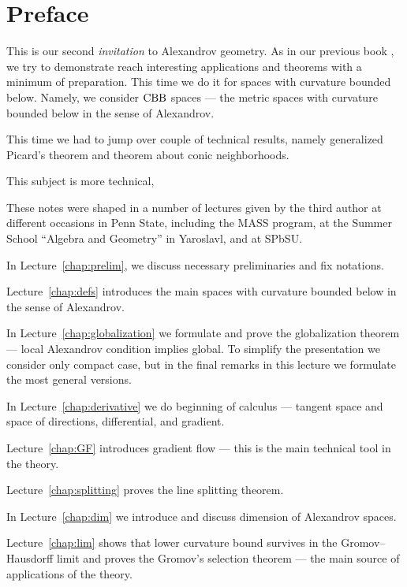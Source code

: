 \chapter*{Preface}

This is our second \textit{invitation} to Alexandrov geometry.
As in our previous book \cite{alexander-kapovitch-petrunin-2019},
we try to demonstrate reach interesting applications and theorems with a minimum of preparation.
This time we do it for spaces with curvature bounded below.
Namely,  we consider $\mathrm{CBB}$ spaces --- the metric spaces with curvature bounded below in the sense of Alexandrov.

This time we had to jump over couple of technical results,
namely generalized Picard's theorem and theorem about conic neighborhoods.




This subject is more technical,

These notes were shaped in a number of lectures given by the third author
at different occasions in Penn State, including the MASS program,
at the Summer School ``Algebra and Geometry'' in Yaroslavl,
and at SPbSU.

\medskip 

In Lecture~\ref{chap:prelim}, we discuss necessary preliminaries and fix notations.

Lecture~\ref{chap:defs} introduces the main spaces with curvature bounded below in the sense of Alexandrov.

In Lecture~\ref{chap:globalization} we formulate and prove the globalization theorem --- local Alexandrov condition implies global.
To simplify the presentation we consider only compact case,
but in the final remarks in this lecture we formulate the most general versions.

In Lecture~\ref{chap:derivative} we do beginning of calculus --- tangent space and space of directions, differential, and gradient.

Lecture~\ref{chap:GF} introduces gradient flow --- this is the main technical tool in the theory.

Lecture~\ref{chap:splitting} proves the line splitting theorem.

In Lecture~\ref{chap:dim} we introduce and discuss dimension of Alexandrov spaces.

Lecture~\ref{chap:lim} shows that lower curvature bound survives in the Gromov--Hausdorff limit and proves the Gromov's selection theorem --- the main source of applications of the theory.


